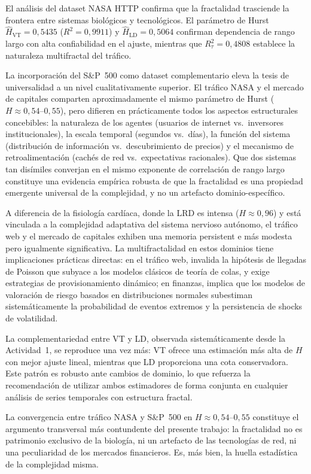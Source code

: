 El análisis del dataset NASA HTTP confirma que la fractalidad trasciende la
frontera entre sistemas biológicos y tecnológicos. El parámetro de Hurst
$\hat{H}_{\text{VT}} = 0{,}5435$ ($R^2 = 0{,}9911$) y
$\hat{H}_{\text{LD}} = 0{,}5064$ confirman dependencia de rango largo con
alta confiabilidad en el ajuste, mientras que $R^2_{\tau} = 0{,}4808$
establece la naturaleza multifractal del tráfico.

La incorporación del S\&P~500 como dataset complementario eleva la tesis de
universalidad a un nivel cualitativamente superior. El tráfico NASA y el mercado
de capitales comparten aproximadamente el mismo parámetro de Hurst
($H \approx 0{,}54$--$0{,}55$), pero difieren en prácticamente todos los
aspectos estructurales concebibles: la naturaleza de los agentes (usuarios de
internet vs.~inversores institucionales), la escala temporal (segundos vs.~días),
la función del sistema (distribución de información vs.~descubrimiento de
precios) y el mecanismo de retroalimentación (cachés de red vs.~expectativas
racionales). Que dos sistemas tan disímiles converjan en el mismo exponente de
correlación de rango largo constituye una evidencia empírica robusta de que la
fractalidad es una propiedad emergente universal de la complejidad, y no un
artefacto dominio-específico.

A diferencia de la fisiología cardíaca, donde la LRD es intensa
($H\approx0{,}96$) y está vinculada a la complejidad adaptativa del sistema
nervioso autónomo, el tráfico web y el mercado de capitales exhiben una memoria
persistent e más modesta pero igualmente significativa. La multifractalidad en
estos dominios tiene implicaciones prácticas directas: en el tráfico web,
invalida la hipótesis de llegadas de Poisson que subyace a los modelos clásicos
de teoría de colas, y exige estrategias de provisionamiento dinámico; en finanzas,
implica que los modelos de valoración de riesgo basados en distribuciones
normales subestiman sistemáticamente la probabilidad de eventos extremos y la
persistencia de shocks de volatilidad.

La complementariedad entre VT y LD, observada sistemáticamente desde la
Actividad~1, se reproduce una vez más: VT ofrece una estimación más alta de $H$
con mejor ajuste lineal, mientras que LD proporciona una cota conservadora. Este
patrón es robusto ante cambios de dominio, lo que refuerza la recomendación de
utilizar ambos estimadores de forma conjunta en cualquier análisis de series
temporales con estructura fractal.

La convergencia entre tráfico NASA y S\&P~500 en $H\approx0{,}54$--$0{,}55$
constituye el argumento transversal más contundente del presente trabajo: la
fractalidad no es patrimonio exclusivo de la biología, ni un artefacto de las
tecnologías de red, ni una peculiaridad de los mercados financieros. Es, más
bien, la huella estadística de la complejidad misma.
